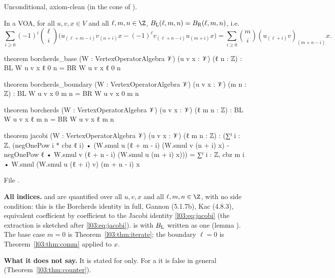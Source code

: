 \begin{status}
Unconditional, axiom-clean (in the cone of ).
\end{status}

\begin{theorem}\label{l03:thm:borcherds}
In a VOA, for all $u,v,x\in V$ and all $\ell,m,n\in\Z$, $B_{\mathrm L}(\ell,m,n) = B_{\mathrm R}(\ell,m,n)$, i.e.
\begin{equation}\label{l03:eq:borcherds}
\sum_{i\ge0}(-1)^i\binom\ell i\Big(u_{(\ell+m-i)}v_{(n+i)}x - (-1)^\ell v_{(\ell+n-i)}u_{(m+i)}x\Big)
 = \sum_{i\ge0}\binom mi(u_{(\ell+i)}v)_{(m+n-i)}x .
\end{equation}
\end{theorem}
\begin{leancode}
theorem borcherds_base (W : VertexOperatorAlgebra 𝒱) (u v x : 𝒱) (ℓ n : ℤ) :
    BL W u v x ℓ 0 n = BR W u v x ℓ 0 n

theorem borcherds_boundary (W : VertexOperatorAlgebra 𝒱) (u v x : 𝒱) (m n : ℤ) :
    BL W u v x 0 m n = BR W u v x 0 m n

theorem borcherds (W : VertexOperatorAlgebra 𝒱) (u v x : 𝒱) (ℓ m n : ℤ) :
    BL W u v x ℓ m n = BR W u v x ℓ m n

theorem jacobi (W : VertexOperatorAlgebra 𝒱) (u v x : 𝒱) (ℓ m n : ℤ) :
    (∑ᶠ i : ℤ, (negOnePow i * cbz ℓ i) •
        (W.smul u (ℓ + m - i) (W.smul v (n + i) x)
          - negOnePow ℓ • W.smul v (ℓ + n - i) (W.smul u (m + i) x)))
      = ∑ᶠ i : ℤ, cbz m i • W.smul (W.smul u (ℓ + i) v) (m + n - i) x
\end{leancode}
File .

\begin{dictionary}
\textbf{All indices.}  and  are quantified over all $u,v,x$ and all
$\ell,m,n\in\Z$, with no side condition: this is the Borcherds identity in full, Gannon (5.1.7b),
Kac (4.8.3), equivalent coefficient by coefficient to the Jacobi identity \eqref{l03:eq:jacobi}
(the extraction is sketched after \eqref{l03:eq:jacobi}).  is  with
$B_{\mathrm L}$ written as one  (lemma ). The base case $m = 0$ is
Theorem~\ref{l03:thm:iterate}; the boundary $\ell = 0$ is Theorem~\ref{l03:thm:comm} applied to $x$.

\textbf{What it does not say.} It is stated for  only. For a
 it is false in general (Theorem~\ref{l03:thm:counter}).
\end{dictionary}

